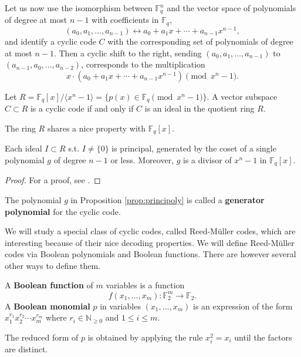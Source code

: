\documentclass[english,bachelor]{liumaiex}
\begin{document}
Let us now use the isomorphism between $\mathbb{F}_q^n$ and the vector space of polynomials of degree at most $n-1$ with coefficients in $\mathbb{F}_q$,
\begin{displaymath}
(a_0,a_1,\dots,a_{n-1})\leftrightarrow a_0+a_1x+\cdots+a_{n-1}x^{n-1},
\end{displaymath}
and identify a cyclic code $C$ with the corresponding set of polynomials of degree at most $n-1$. Then a cyclic shift to the right, sending $(a_0,a_1,\dots,a_{n-1})$ to $(a_{n-1},a_0,\dots,a_{n-2})$, corresponds to the multiplication $$x\cdot (a_0+a_1x+\cdots+a_{n-1}x^{n-1}) \pmod{x^n-1}.$$

\begin{prop}
Let $R=\mathbb{F}_q[x]/\langle x^n-1\rangle = \{p(x)\in\mathbb{F}_q \pmod{x^n-1}\}$. A vector subspace $C\subset R$ is a cyclic code if and only if $C$ is an ideal in the quotient ring $R$.
\end{prop}
The ring $R$ shares a nice property with $\mathbb{F}_q[x]$.

\begin{prop}
\label{prop:principoly}
Each ideal $I\subset R$ s.t. $I\neq\{0\}$ is principal, generated by the coset of a single polynomial $g$ of degree $n-1$ or less. Moreover, $g$ is a divisor of $x^n-1$ in $\mathbb{F}_q[x]$.
\end{prop}
\begin{proof}
For a proof, see \cite[p. 469]{uag}.
\end{proof}

\begin{define}
The polynomial $g$ in Proposition \ref{prop:principoly} is called a \textbf{generator polynomial} for the cyclic code.
\end{define}
We will study a special class of cyclic codes, called Reed-M{\"u}ller codes, which are interesting because of their nice decoding properties. We will define Reed-M{\"u}ller codes via Boolean polynomials and Boolean functions. There are however several other ways to define them.

\begin{define}
A \textbf{Boolean function} of $m$ variables is a function
\begin{displaymath}
f(x_1,\dots,x_m)\colon \mathbb{F}_2^m\to\mathbb{F}_2.
\end{displaymath}
A \textbf{Boolean monomial} $p$ in variables $(x_1,\dots,x_m)$ is an expression of the form $x_1^{r_1}x_2^{r_2}\cdots x_m^{r_m}$ where $r_i\in\mathbb{N}_{\geq0}$ and $1\leq i\leq m$.
\end{define}
The reduced form of $p$ is obtained by applying the rule $x_i^2=x_i$ until the factors are distinct.
\end{document}
